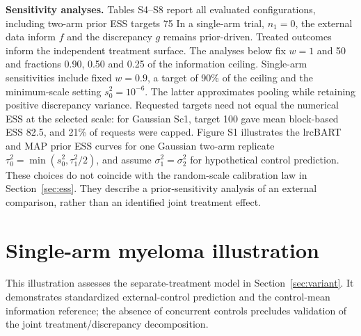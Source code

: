 \documentclass[11pt]{article}
\theoremstyle{remark}\newtheorem{remark}{Remark}[section]
\providecommand{\DIFaddtex}[1]{{\protect\color{blue} \sf #1}} %
\providecommand{\DIFdeltex}[1]{{\protect\color{red} \scriptsize #1}} %
\providecommand{\DIFaddbegin}{} %
\providecommand{\DIFaddend}{} %
\providecommand{\DIFdelbegin}{} %
\providecommand{\DIFdelend}{} %
\providecommand{\DIFadd}[1]{\texorpdfstring{\DIFaddtex{#1}}{#1}} %
\providecommand{\DIFdel}[1]{\texorpdfstring{\DIFdeltex{#1}}{}} %
\begin{document}
\DIFdelbegin %
\DIFdel{\textbf{Sensitivity analyses.}
Tables S4--S8 report all evaluated configurations, including two-arm prior ESS targets 75 }\DIFdelend \DIFaddbegin \DIFadd{In a single-arm trial, $n_1=0$, the external data inform $f$ and the discrepancy $g$ remains prior-driven. Treated outcomes inform the independent treatment surface. The analyses below fix $w=1$ }\DIFaddend and \DIFdelbegin \DIFdel{50 and fractions 0.90, 0.50 and 0.25 of the information ceiling. Single-arm sensitivities include fixed $w=0.9$, a target of 90\% of the ceiling and the minimum-scale setting $s_0^2=10^{-6}$. The latter approximates pooling while retaining positive discrepancy variance. Requested targets need not equal the numerical ESS at the selected scale: for Gaussian Sc1, target 100 gave mean block-based ESS 82.5, and 21\% of requests were capped.
Figure S1 illustrates the lrcBART and MAP prior ESS curves for one Gaussian two-arm replicate}\DIFdelend \DIFaddbegin \DIFadd{$\tau_0^2=\min(s_0^2,\tau_1^2/2)$, and assume $\sigma_1^2=\sigma_2^2$ for hypothetical control prediction. These choices do not coincide with the random-scale calibration law in Section~\ref{sec:ess}. They describe a prior-sensitivity analysis of an external comparison, rather than an identified joint treatment effect.
}

\section{\DIFadd{Single-arm myeloma illustration}}\label{sec:application}
\DIFadd{This illustration assesses the separate-treatment model in Section~\ref{sec:variant}. It demonstrates standardized external-control prediction and the control-mean information reference; the absence of concurrent controls precludes validation of the joint treatment/discrepancy decomposition}\DIFaddend .
\end{document}
